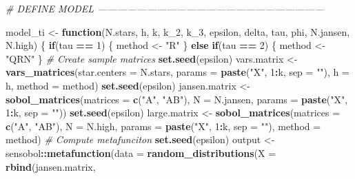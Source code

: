 \documentclass[11pt,]{article}
\newenvironment{Shaded}{\begin{snugshade}}{\end{snugshade}}
\newcommand{\CommentTok}[1]{\textcolor[rgb]{0.56,0.35,0.01}{\textit{#1}}}
\newcommand{\ControlFlowTok}[1]{\textcolor[rgb]{0.13,0.29,0.53}{\textbf{#1}}}
\newcommand{\DataTypeTok}[1]{\textcolor[rgb]{0.13,0.29,0.53}{#1}}
\newcommand{\DecValTok}[1]{\textcolor[rgb]{0.00,0.00,0.81}{#1}}
\newcommand{\KeywordTok}[1]{\textcolor[rgb]{0.13,0.29,0.53}{\textbf{#1}}}
\newcommand{\NormalTok}[1]{#1}
\newcommand{\OperatorTok}[1]{\textcolor[rgb]{0.81,0.36,0.00}{\textbf{#1}}}
\newcommand{\StringTok}[1]{\textcolor[rgb]{0.31,0.60,0.02}{#1}}
\begin{document}
\begin{Shaded}
\begin{Highlighting}[]
\CommentTok{# DEFINE MODEL ---------------------------------------------------------------------}

\NormalTok{model_ti <-}\StringTok{ }\ControlFlowTok{function}\NormalTok{(N.stars, h, k, k_}\DecValTok{2}\NormalTok{, k_}\DecValTok{3}\NormalTok{, epsilon, delta, tau, phi, N.jansen, N.high) \{}
  \ControlFlowTok{if}\NormalTok{(tau }\OperatorTok{==}\StringTok{ }\DecValTok{1}\NormalTok{) \{}
\NormalTok{    method <-}\StringTok{ "R"}
\NormalTok{  \} }\ControlFlowTok{else} \ControlFlowTok{if}\NormalTok{(tau }\OperatorTok{==}\StringTok{ }\DecValTok{2}\NormalTok{) \{}
\NormalTok{    method <-}\StringTok{ "QRN"}
\NormalTok{  \}}
  \CommentTok{# Create sample matrices}
  \KeywordTok{set.seed}\NormalTok{(epsilon)}
\NormalTok{  vars.matrix <-}\StringTok{ }\KeywordTok{vars_matrices}\NormalTok{(}\DataTypeTok{star.centers =}\NormalTok{ N.stars, }\DataTypeTok{params =} \KeywordTok{paste}\NormalTok{(}\StringTok{"X"}\NormalTok{, }\DecValTok{1}\OperatorTok{:}\NormalTok{k, }\DataTypeTok{sep =} \StringTok{""}\NormalTok{), }\DataTypeTok{h =}\NormalTok{ h, }
                               \DataTypeTok{method =}\NormalTok{ method)}
  \KeywordTok{set.seed}\NormalTok{(epsilon)}
\NormalTok{  jansen.matrix <-}\StringTok{ }\KeywordTok{sobol_matrices}\NormalTok{(}\DataTypeTok{matrices =} \KeywordTok{c}\NormalTok{(}\StringTok{"A"}\NormalTok{, }\StringTok{"AB"}\NormalTok{), }\DataTypeTok{N =}\NormalTok{ N.jansen, }
                                  \DataTypeTok{params =} \KeywordTok{paste}\NormalTok{(}\StringTok{"X"}\NormalTok{, }\DecValTok{1}\OperatorTok{:}\NormalTok{k, }\DataTypeTok{sep =} \StringTok{""}\NormalTok{))}
  \KeywordTok{set.seed}\NormalTok{(epsilon)}
\NormalTok{  large.matrix <-}\StringTok{ }\KeywordTok{sobol_matrices}\NormalTok{(}\DataTypeTok{matrices =} \KeywordTok{c}\NormalTok{(}\StringTok{"A"}\NormalTok{, }\StringTok{"AB"}\NormalTok{), }\DataTypeTok{N =}\NormalTok{ N.high, }
                                 \DataTypeTok{params =} \KeywordTok{paste}\NormalTok{(}\StringTok{"X"}\NormalTok{, }\DecValTok{1}\OperatorTok{:}\NormalTok{k, }\DataTypeTok{sep =} \StringTok{""}\NormalTok{), }
                                 \DataTypeTok{method =}\NormalTok{ method)}
  \CommentTok{# Compute metafunciton}
  \KeywordTok{set.seed}\NormalTok{(epsilon)}
\NormalTok{  output <-}\StringTok{ }\NormalTok{sensobol}\OperatorTok{::}\KeywordTok{metafunction}\NormalTok{(}\DataTypeTok{data =} \KeywordTok{random_distributions}\NormalTok{(}\DataTypeTok{X =} \KeywordTok{rbind}\NormalTok{(jansen.matrix, }

\end{Highlighting}
\end{Shaded}
\end{document}
